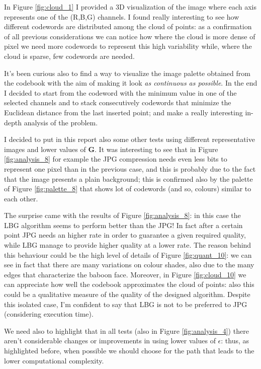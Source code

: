 \documentclass{report}
\begin{document}
In Figure \ref{fig:cloud_1} I provided a 3D visualization of the image where each axis represents one of the (R,B,G) channels. I found really interesting to see how different codewords are distributed among the cloud of points: as a confirmation of all previous considerations we can notice how where the cloud is more dense of pixel we need more codewords to represent this high variability while, where the cloud is sparse, few codewords are needed. 

It's been curious also to find a way to visualize the image palette obtained from the codebook with the aim of making it look \textit{as continuous as possible}. In the end I decided to start from the codeword with the minimum value in one of the selected channels and to stack consecutively codewords that minimize the Euclidean distance from the last inserted point; \cite{sort_color} and \cite{disney_color_kingdom} make a really interesting in-depth analysis of the problem. 

I decided to put in this report also some other tests using different representative images and lower values of \textbf{G}. It was interesting to see that in Figure \ref{fig:analysis_8} for example the JPG compression needs even less bits to represent one pixel than in the previous case, and this is probably due to the fact that the image presents a plain background; this is confirmed also by the palette of Figure \ref{fig:palette_8} that shows lot of codewords (and so, colours) similar to each other.

The surprise came with the results of Figure \ref{fig:analysis_8}: in this case the LBG algorithm seems to perform better than the JPG! In fact after a certain point JPG needs an higher rate in order to guarantee a given required quality, while LBG manage to provide higher quality at a lower rate. The reason behind this behaviour could be the high level of details of Figure \ref{fig:quant_10}: we can see in fact that there are many variations on colour shades, also due to the many edges that characterize the baboon face. Moreover, in Figure \ref{fig:cloud_10} we can appreciate how well the codebook approximates the cloud of points: also this could be a qualitative measure of the quality of the designed algorithm. Despite this isolated case, I'm confident to say that LBG is not to be preferred to JPG (considering execution time). 

We need also to highlight that in all tests (also in Figure \ref{fig:analysis_4}) there aren't considerable changes or improvements in using lower values of $\epsilon$: thus, as highlighted before, when possible we should choose for the path that leads to the lower computational complexity.
\end{document}
